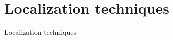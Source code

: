\documentclass[11pt]{beamer}
\begin{document}









\section{Localization techniques}

\begin{frame}{}

  \begin{center}

    {\Huge Localization techniques}

  \end{center}

\end{frame}
\end{document}
